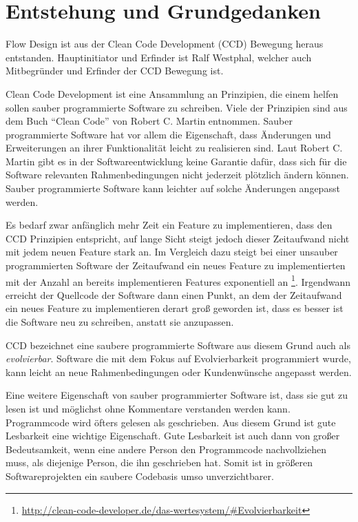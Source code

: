 \chapter{Entstehung und Grundgedanken}


Flow Design ist aus der Clean Code Development  (CCD) Bewegung heraus entstanden. Hauptinitiator und Erfinder ist Ralf Westphal, welcher auch Mitbegründer und Erfinder der CCD Bewegung ist.


Clean Code Development ist eine Ansammlung an Prinzipien, die einem helfen
sollen sauber programmierte Software zu schreiben. Viele der Prinzipien sind aus dem Buch \enquote{Clean Code} von Robert C. Martin entnommen. Sauber programmierte Software hat 
 vor allem die Eigenschaft, dass Änderungen und Erweiterungen an ihrer Funktionalität
leicht zu realisieren sind. Laut Robert C. Martin \cite{Martin2009} gibt es in der Softwareentwicklung
keine Garantie dafür, dass sich für die Software relevanten
Rahmenbedingungen nicht jederzeit plötzlich ändern können. Sauber programmierte
Software kann leichter auf solche Änderungen angepasst werden. 

Es bedarf zwar anfänglich mehr Zeit ein Feature zu implementieren, dass den CCD Prinzipien entspricht, auf lange Sicht steigt jedoch dieser Zeitaufwand nicht mit jedem neuen Feature stark
an. Im Vergleich dazu steigt bei einer unsauber programmierten Software der Zeitaufwand ein neues
Feature zu implementierten mit der Anzahl an bereits implementieren Features
exponentiell an \footnote{\url{http://clean-code-developer.de/das-wertesystem/\#Evolvierbarkeit}}.
Irgendwann erreicht der Quellcode der Software dann einen Punkt, an
dem der Zeitaufwand ein neues Feature zu implementieren derart groß geworden ist, dass es besser ist die Software neu zu schreiben, anstatt sie anzupassen.

CCD bezeichnet eine saubere programmierte Software aus diesem Grund auch als \emph{evolvierbar}.
Software die mit dem Fokus auf Evolvierbarkeit programmiert wurde,
kann leicht an neue Rahmenbedingungen oder Kundenwünsche angepasst werden.


Eine weitere Eigenschaft von sauber programmierter Software ist, dass sie gut zu
lesen ist und möglichst ohne Kommentare verstanden werden kann.
Programmcode wird öfters gelesen als geschrieben. Aus diesem Grund ist gute
Lesbarkeit eine wichtige Eigenschaft. Gute Lesbarkeit ist auch dann von großer
Bedeutsamkeit, wenn eine andere Person den Programmcode nachvollziehen muss, als diejenige Person, die ihn geschrieben hat.
Somit ist in größeren Softwareprojekten ein saubere Codebasis umso unverzichtbarer.

